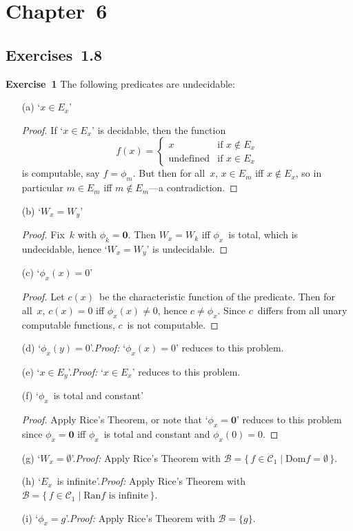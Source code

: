 \documentclass[letterpaper]{article}
\newcommand{\exercise}[2][]{\noindent\textbf{Exercise~{#2}}\ifthenelse{\isempty{#1}}{\textbf{.}}{ ({#1})\textbf{.}}}
\newcommand{\B}{\mathcal{B}}
\newcommand{\C}{\mathcal{C}}
\newcommand{\dom}{\mathrm{Dom}}
\newcommand{\ran}{\mathrm{Ran}}
\theoremstyle{plain}
\theoremstyle{definition}
\theoremstyle{remark}
\begin{document}
\section*{Chapter~6}
\subsection*{Exercises~1.8}

\exercise{1}
The following predicates are undecidable:
\begin{enumerate}[itemsep=0pt]
\item[(a)] `$x\in E_x$'
\begin{proof}
If `$x\in E_x$' is decidable, then the function
$$f(x)=\begin{cases}
x&\text{if }x\not\in E_x\\
\text{undefined}&\text{if }x\in E_x
\end{cases}$$
is computable, say $f=\phi_m$. But then for all~$x$, $x\in E_m$ iff $x\not\in E_x$, so in particular $m\in E_m$ iff $m\not\in E_m$---a contradiction.
\end{proof}
\item[(b)] `$W_x=W_y$'
\begin{proof}
Fix~$k$ with $\phi_k=\mathbf{0}$. Then $W_x=W_k$ iff $\phi_x$~is total, which is undecidable, hence `$W_x=W_y$' is undecidable.
\end{proof}
\item[(c)] `$\phi_x(x)=0$'
\begin{proof}
Let $c(x)$~be the characteristic function of the predicate. Then for all~$x$, $c(x)=0$ iff $\phi_x(x)\ne 0$, hence $c\ne\phi_x$. Since $c$~differs from all unary computable functions, $c$~is not computable.
\end{proof}
\item[(d)] `$\phi_x(y)=0$'.\quad\emph{Proof:} `$\phi_x(x)=0$' reduces to this problem.
\item[(e)] `$x\in E_y$'.\quad\emph{Proof:} `$x\in E_x$' reduces to this problem.
\item[(f)] `$\phi_x$~is total and constant'
\begin{proof}
Apply Rice's Theorem, or note that `$\phi_x=\mathbf{0}$' reduces to this problem since $\phi_x=\mathbf{0}$ iff $\phi_x$~is total and constant and $\phi_x(0)=0$.
\end{proof}
\item[(g)] `$W_x=\emptyset$'.\quad\emph{Proof:} Apply Rice's Theorem with $\B=\{\,f\in\C_1\mid\dom f=\emptyset\,\}$.
\item[(h)] `$E_x$~is infinite'.\quad\emph{Proof:} Apply Rice's Theorem with $\B=\{\,f\in\C_1\mid\ran f\text{ is infinite}\,\}$.
\item[(i)] `$\phi_x=g$'.\quad\emph{Proof:} Apply Rice's Theorem with $\B=\{g\}$.
\end{enumerate}
\end{document}
